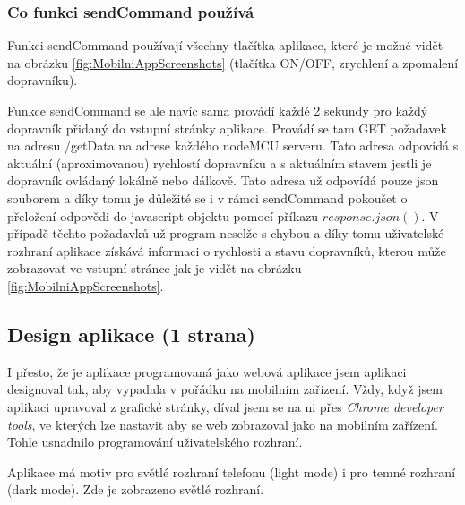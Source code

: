 \subsubsection{Co funkci sendCommand používá}

Funkci sendCommand používají všechny tlačítka aplikace, které je možné vidět na obrázku \ref{fig:MobilniAppScreenshots} (tlačítka ON/OFF, zrychlení a zpomalení dopravníku).

Funkce sendCommand se ale navíc sama provádí každé 2 sekundy pro každý dopravník přidaný do vstupní stránky aplikace. Provádí se tam GET požadavek na adresu /getData na adrese každého nodeMCU serveru. Tato adresa odpovídá s aktuální (aproximovanou) rychlostí dopravníku a s aktuálním stavem jestli je dopravník ovládaný lokálně nebo dálkově. Tato adresa už odpovídá pouze json souborem a díky tomu je důležité se i v rámci sendCommand pokoušet o přeložení odpovědi do javascript objektu pomocí příkazu $response.json()$. V případě těchto požadavků už program neselže s chybou a díky tomu uživatelské rozhraní aplikace získává informaci o rychlosti a stavu dopravníků, kterou může zobrazovat ve vstupní stránce jak je vidět na obrázku \ref{fig:MobilniAppScreenshots}.

\subsection{Design aplikace (1 strana)}

I přesto, že je aplikace programovaná jako webová aplikace jsem aplikaci designoval tak, aby vypadala v pořádku na mobilním zařízení. Vždy, když jsem aplikaci upravoval z grafické stránky, díval jsem se na ni přes \textit{Chrome developer tools}, ve kterých lze nastavit aby se web zobrazoval jako na mobilním zařízení. Tohle usnadnilo programování uživatelského rozhraní.

Aplikace má motiv pro světlé rozhraní telefonu (light mode) i pro temné rozhraní (dark mode). Zde je zobrazeno světlé rozhraní.

